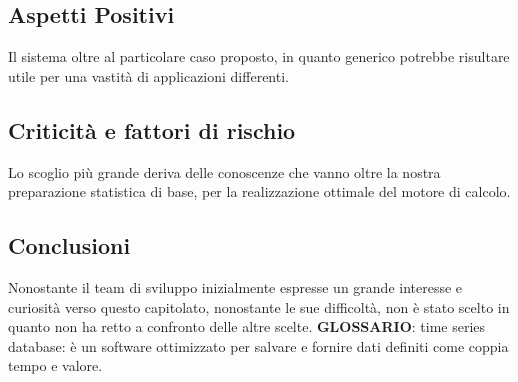 \subsection{Aspetti Positivi}
Il sistema oltre al particolare caso proposto, in quanto generico potrebbe risultare utile per una vastità di applicazioni differenti.

\subsection{Criticità e fattori di rischio}
Lo scoglio più grande deriva delle conoscenze che vanno oltre la nostra preparazione statistica di base, per la realizzazione ottimale del motore di calcolo.

\subsection{Conclusioni}
Nonostante il team di sviluppo inizialmente espresse un grande interesse e curiosità verso questo capitolato, nonostante le sue difficoltà, non è stato scelto in quanto non ha retto a confronto delle altre scelte. 
\textbf{GLOSSARIO}: time series database: è un software ottimizzato per salvare e fornire dati definiti come coppia tempo e valore. 